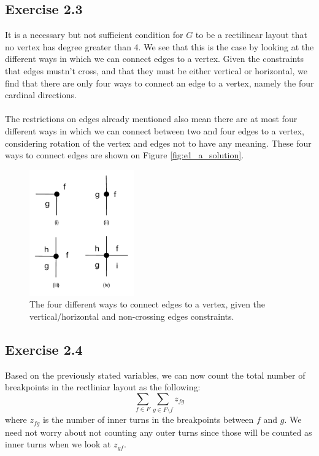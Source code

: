 \documentclass[12pt]{article}
\begin{document}
\subsection*{Exercise 2.3}
It is a necessary but not sufficient condition for $G$ to be a rectilinear layout that no vertex has degree greater than 4. We see that this is the case by looking at the different ways in which we can connect edges to a vertex. Given the constraints that edges mustn't cross, and that they must be either vertical or horizontal, we find that there are only four ways to connect an edge to a vertex, namely the four cardinal directions.\\
\\
The restrictions on edges already mentioned also mean there are at most four different ways in which we can connect between two and four edges to a vertex, considering rotation of the vertex and edges not to have any meaning. These four ways to connect edges are shown on Figure \ref{fig:e1_a_solution}.

\begin{figure}[h]
    \centering
      \includegraphics[width=0.4\textwidth]{figures/e2_3}
    \caption{The four different ways to connect edges to a vertex, given the vertical/horizontal and non-crossing edges constraints.}
    \label{fig:e2_3}
\end{figure}

\subsection*{Exercise 2.4}
  
  Based on the previously stated variables, we can now count the total number of breakpoints in the rectliniar layout as the following:
  $$\sum_{f \in F}\sum_{g \in F \setminus f} z_{fg}$$
  where $z_{fg}$ is the number of inner turns in the breakpoints between $f$ and $g$. We need not worry about not counting any outer turns since those will be counted as inner turns when we look at $z_{gf}$.
\end{document}
